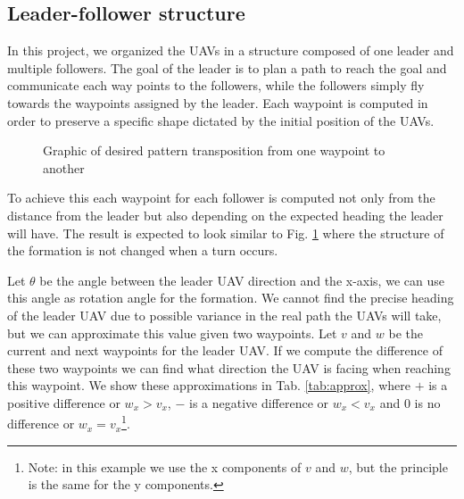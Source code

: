 \subsection{Leader-follower structure}

In this project, we organized the UAVs in a structure composed of one leader and
multiple followers. The goal of the leader is to plan a path to reach the goal
and communicate each way points to the followers, while the followers simply
fly towards the waypoints assigned by the leader. Each waypoint is computed in 
order to preserve a specific shape dictated by the initial position of the UAVs.

\begin{figure}[h]
	\begin{center}
		
	\end{center}
	\caption{Graphic of desired pattern transposition from one waypoint to another}\label{fig:pf-1}
\end{figure}

To achieve this each waypoint for each follower is computed not only from the distance 
from the leader but also depending on the expected heading the leader will have. The 
result is expected to look similar to Fig. \ref{fig:pf-1} where the structure of
the formation is not changed when a turn occurs. 

Let $\theta$ be the angle between
the leader UAV direction and the x-axis, we can use this angle as rotation angle for 
the formation. We cannot find the precise heading of the leader UAV due to possible
variance in the real path the UAVs will take, but we can approximate this value given
two waypoints. Let $v$ and $w$ be the current and next waypoints for the leader UAV. 
If we compute the difference of these two waypoints we can find what direction the 
UAV is facing when reaching this waypoint. We show these approximations in Tab. \ref{tab:approx},
where $+$ is a positive difference or $w_x > v_x$, $-$ is a negative difference or $w_x < v_x$
and $0$ is no difference or $w_x = v_x$\footnote{Note: in this example we use the x components of $v$ and $w$, 
but the principle is the same for the y components.}.

